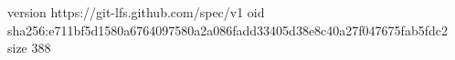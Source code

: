 version https://git-lfs.github.com/spec/v1
oid sha256:e711bf5d1580a6764097580a2a086fadd33405d38e8c40a27f047675fab5fdc2
size 388
